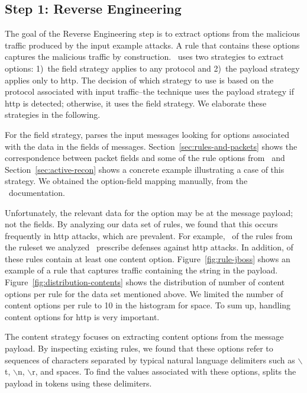 \documentclass[sigconf,review, anonymous]{acmart}
\begin{document}
\subsection{Step 1: Reverse Engineering}
\label{sec:reverse-engineering}

The goal of the Reverse Engineering step is to extract options from
the malicious traffic produced by the input example attacks. A rule
that contains these options captures the malicious traffic by
construction. \tname\ uses two strategies to extract options: 1)~the
field strategy applies to any protocol and 2)~the payload strategy
applies only to http.  The decision of which strategy to use is based
on the protocol associated with input traffic--the technique uses the
payload strategy if http is detected; otherwise, it uses the field
strategy. We elaborate these strategies in the following.

For the field strategy, \tname{} parses the input messages looking for
options associated with the data in the fields of
messages. Section~\ref{sec:rules-and-packets} shows the correspondence
between packet fields and some of the rule options from \suri\ and
Section~\ref{sec:active-recon} shows a concrete example illustrating a
case of this strategy. We obtained the option-field mapping
manually, from the \suri\ documentation.

Unfortunately, the relevant data for the option may be at the message
payload; not the fields. By analyzing our data set of rules, we found
that this occurs frequently in http attacks, which are prevalent. For
example, \percHttp\ of the \numrulessuri{} rules from the ruleset we
analyzed~\cite{emerging-threats-open} prescribe defenses against http
attacks. In addition, \percRulesWithContent{} of these rules contain
at least one content option. Figure~\ref{fig:rule-jboss} shows an
example of a rule that captures traffic containing the string
 in the payload.
Figure~\ref{fig:distribution-contents} shows the distribution of
number of content options per rule for the data set mentioned
above. We limited the number of content options per rule to 10 in the
histogram for space.   To sum up, handling content options for
http is very important.

The content strategy focuses on extracting content options from the
message payload. By inspecting existing rules, we found that these
options refer to sequences of characters separated by typical natural
language delimiters such as $\backslash$t, $\backslash$n,
$\backslash$r, and spaces. To find the values associated with these
options, \tname{} splits the payload in tokens using these delimiters.
\end{document}

